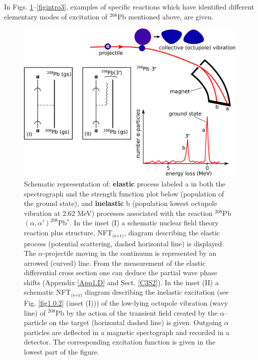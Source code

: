 In Figs. \ref{figintro1}--\ref{figintro3}, examples of specific reactions which have identified different elementary modes of excitation of $^{208}$Pb mentioned above, are given.
\begin{figure}
\centerline {
\includegraphics*[width=15cm]{introduccion/figs/figintro1}
}
\caption{Schematic representation of:  \textbf{elastic} process labeled a in both the spectrograph and the strength function plot below (population of the ground state), and \textbf{inelastic} b (population lowest octupole vibration at 2.62 MeV) processes associated with the reaction $^{208}$Pb$(\alpha,\alpha')^{208}$Pb$^*$.  In the inset (I) a schematic nuclear field theory reaction plus structure, NFT$_{\text{(s+r)}}$,  diagram describing  the elastic process (potential scattering, dashed horizontal line) is displayed. The $\alpha$-projectile moving in the continuum is represented by an arrowed (curved) line. From the measurement of the elastic differential cross section one can deduce the partial wave phase shifts (Appendix \ref{App1.D} and Sect. \ref{C3S2}). In the inset (II) a schematic NFT$_{\text{(s+r)}}$ diagram describing the inelastic  excitation (see Fig.  \ref{fig1.0.2} (inset (I))) of the low-lying octupole vibration (wavy line) of $^{208}$Pb by the action of the transient field created by the $\alpha$--particle on the target (horizontal dashed line) is given.  Outgoing $\alpha$ particles are deflected in a magnetic spectograph and recorded in a detector. The corresponding excitation function is given in the lowest part of the figure.}
\label{figintro1}
\end{figure}
